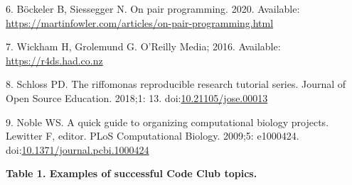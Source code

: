 \documentclass[
  11pt,
]{article}
\begin{document}
\leavevmode\hypertarget{ref-Bockeler_2020}{}%
6. Böckeler B, Siessegger N. On pair programming. 2020. Available:
\url{https://martinfowler.com/articles/on-pair-programming.html}

\leavevmode\hypertarget{ref-Wickham_2016}{}%
7. Wickham H, Grolemund G. O'Reilly Media; 2016. Available:
\url{https://r4ds.had.co.nz}

\leavevmode\hypertarget{ref-Schloss_2018}{}%
8. Schloss PD. The riffomonas reproducible research tutorial series.
Journal of Open Source Education. 2018;1: 13.
doi:\href{https://doi.org/10.21105/jose.00013}{10.21105/jose.00013}

\leavevmode\hypertarget{ref-Noble2009}{}%
9. Noble WS. A quick guide to organizing computational biology projects.
Lewitter F, editor. PLoS Computational Biology. 2009;5: e1000424.
doi:\href{https://doi.org/10.1371/journal.pcbi.1000424}{10.1371/journal.pcbi.1000424}

\newpage

\textbf{Table 1. Examples of successful Code Club topics.}
\end{document}
